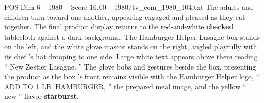 \begin{textsample}{POS Dim 6 – 1980 – Score 16.00 – 1980/tv\_com\_1980\_104.txt}
The adults and children turn toward one another, appearing engaged and pleased as they eat together.
The final product display returns to the red-and-white \textbf{checked} tablecloth against a dark background.
The Hamburger Helper Lasagne box stands on the left, and the white glove mascot stands on the right, angled playfully with its chef ’s hat drooping to one side.
Large white text appears above them reading “ New Zestier Lasagne. ” The glove bobs and gestures beside the box, presenting the product as the box ’s front remains visible with the Hamburger Helper logo, “ ADD TO 1 LB.
HAMBURGER, ” the prepared meal image, and the yellow “ new ” flavor \textbf{starburst}.

\end{textsample}

